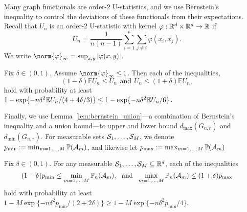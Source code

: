 Many graph functionals are order-2 U-statistics, and we use Bernstein's inequality to control the deviations of these functionals from their expectations. Recall that $U_n$ is an order-2 U-statistic with kernel $\varphi: \mathbb{R}^d \times \mathbb{R}^d \to \mathbb{R}$ if 
\begin{equation*}
U_n = \frac{1}{n(n-1)}\sum_{i = 1}^{n} \sum_{j \neq i} \varphi(x_i,x_j).
\end{equation*}
We write $\norm{\varphi}_{\infty} = \sup_{x,y} |\varphi(x,y)|$. 
\begin{lemma}
	\label{lem:hoeffding}
	Fix $\delta \in (0,1)$. Assume $\norm{\varphi}_{\infty} \leq 1$. Then each of the inequalities,
	\begin{equation*}
	(1 - \delta) \mathbb{E}U_n \leq U_n~~\textrm{and}~~ U_n\leq (1 + \delta) \mathbb{E}U_n,
	\end{equation*}
	hold with probability at least $1 - \exp\{-n\delta^2 \mathbb{E} U_n/(4 + 4\delta/3)\} \leq 1 - \exp\{-n\delta^2 \mathbb{E} U_n/6\}$.
\end{lemma}

Finally, we use Lemma~\ref{lem:bernstein_union}---a combination of Bernstein's inequality and a union bound---to upper and lower bound $d_{\max}(G_{n,r})$ and $d_{\min}(G_{n,r})$. For measurable sets $\mathcal{S}_1,\ldots,\mathcal{S}_M$, we denote $p_{\min} := \min_{m = 1,\ldots,M} \mathbb{P}(\mathcal{A}_m)$, and likewise let $p_{\max} := \max_{m = 1,\ldots,M} \mathbb{P}(\mathcal{A}_m)$
\begin{lemma}
	\label{lem:bernstein_union}
	Fix $\delta \in (0,1)$. For any measurable $\mathcal{S}_1,\ldots,\mathcal{S}_M \subseteq \mathbb{R}^d$, each of the inequalities
	\begin{equation*}
	(1 - \delta) p_{\min} \leq \min_{m = 1,\ldots,M} \mathbb{P}_n(\mathcal{A}_m),~~\textrm{and}~~\max_{m = 1,\ldots,M}  \mathbb{P}_n(\mathcal{A}_m) \leq (1 + \delta) p_{\max}
	\end{equation*}
	hold with probability at least $1 - M \exp \{-n\delta^2p_{\min}/(2 + 2\delta) \} \geq 1 - M \exp\{-n\delta^2p_{\min}/4\}$.  
\end{lemma}

